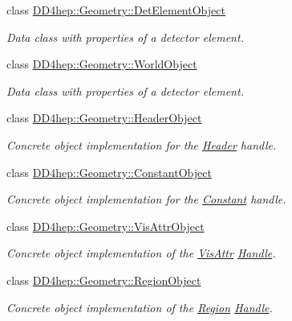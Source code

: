 \begin{DoxyCompactItemize}
class \hyperlink{class_d_d4hep_1_1_geometry_1_1_det_element_object}{D\+D4hep\+::\+Geometry\+::\+Det\+Element\+Object}
\begin{DoxyCompactList}\small\item\em Data class with properties of a detector element. \end{DoxyCompactList}\item 
class \hyperlink{class_d_d4hep_1_1_geometry_1_1_world_object}{D\+D4hep\+::\+Geometry\+::\+World\+Object}
\begin{DoxyCompactList}\small\item\em Data class with properties of a detector element. \end{DoxyCompactList}\item 
class \hyperlink{class_d_d4hep_1_1_geometry_1_1_header_object}{D\+D4hep\+::\+Geometry\+::\+Header\+Object}
\begin{DoxyCompactList}\small\item\em Concrete object implementation for the \hyperlink{class_d_d4hep_1_1_geometry_1_1_header}{Header} handle. \end{DoxyCompactList}\item 
class \hyperlink{class_d_d4hep_1_1_geometry_1_1_constant_object}{D\+D4hep\+::\+Geometry\+::\+Constant\+Object}
\begin{DoxyCompactList}\small\item\em Concrete object implementation for the \hyperlink{class_d_d4hep_1_1_geometry_1_1_constant}{Constant} handle. \end{DoxyCompactList}\item 
class \hyperlink{class_d_d4hep_1_1_geometry_1_1_vis_attr_object}{D\+D4hep\+::\+Geometry\+::\+Vis\+Attr\+Object}
\begin{DoxyCompactList}\small\item\em Concrete object implementation of the \hyperlink{class_d_d4hep_1_1_geometry_1_1_vis_attr}{Vis\+Attr} \hyperlink{class_d_d4hep_1_1_handle}{Handle}. \end{DoxyCompactList}\item 
class \hyperlink{class_d_d4hep_1_1_geometry_1_1_region_object}{D\+D4hep\+::\+Geometry\+::\+Region\+Object}
\begin{DoxyCompactList}\small\item\em Concrete object implementation of the \hyperlink{class_d_d4hep_1_1_geometry_1_1_region}{Region} \hyperlink{class_d_d4hep_1_1_handle}{Handle}. \end{DoxyCompactList}\item 

\end{DoxyCompactItemize}
